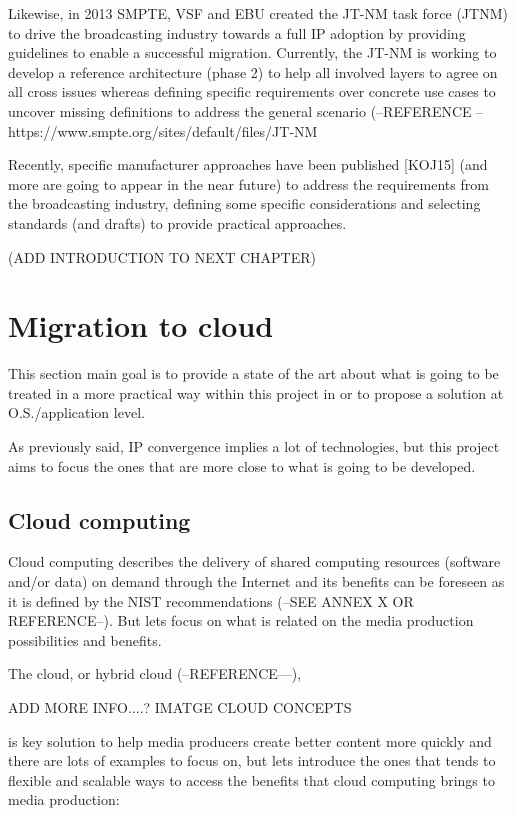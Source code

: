 Likewise, in 2013 SMPTE, VSF and EBU created the JT-NM task force (JTNM) to drive the broadcasting industry towards a full IP adoption by providing guidelines to enable a successful migration. Currently, the JT-NM is working to develop a reference architecture (phase 2) to help all involved layers to agree on all cross issues whereas defining specific requirements over concrete use cases to uncover missing definitions to address the general scenario (--REFERENCE -- https://www.smpte.org/sites/default/files/JT-NM%

Recently, specific manufacturer approaches have been published [KOJ15] (and more are going to appear in the near future) to address the requirements from the broadcasting industry, defining some specific considerations and selecting standards (and drafts) to provide practical approaches.

(ADD INTRODUCTION TO NEXT CHAPTER)

\section{Migration to cloud}

This section main goal is to provide a state of the art about what is going to be treated in a more practical way within this project in or to propose a solution at O.S./application level.

As previously said, IP convergence implies a lot of technologies, but this project aims to focus the ones that are more close to what is going to be developed.

\subsection{Cloud computing}

Cloud computing describes the delivery of shared computing resources (software and/or data) on demand through the Internet and its benefits can be foreseen as it is defined by the NIST recommendations (--SEE ANNEX X OR REFERENCE--). But lets focus on what is related on the media production possibilities and benefits.

The cloud, or hybrid cloud (--REFERENCE---), 

ADD MORE INFO....? IMATGE CLOUD CONCEPTS

is key solution to help media producers create better content more quickly and there are lots of examples to focus on, but lets introduce the ones that tends to flexible and scalable ways to access the benefits that cloud computing brings to media production:

